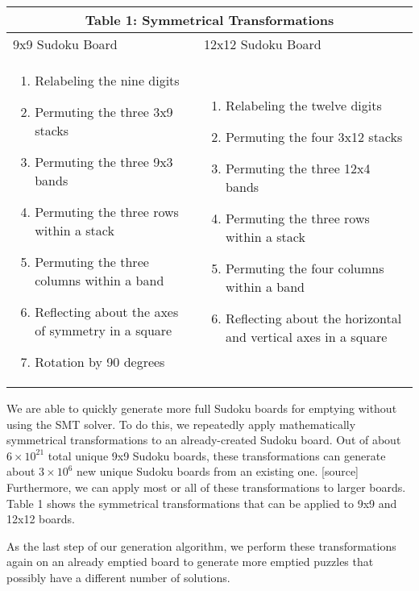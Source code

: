 \singlespace
\begin{table}
\begin{tabularx}{\textwidth}{|X|X|}
\hline
\multicolumn{2}{|c|}{Table 1: Symmetrical Transformations}\\
\hline
9x9 Sudoku Board & 12x12 Sudoku Board
\\
\hline
\begin{enumerate}
\item Relabeling the nine digits
\item Permuting the three 3x9 stacks
\item Permuting the three 9x3 bands
\item Permuting the three rows within a stack
\item Permuting the three columns within a band
\item Reflecting about the axes of symmetry in a square
\item Rotation by 90 degrees
\end{enumerate} &

\begin{enumerate}
\item Relabeling the twelve digits
\item Permuting the four 3x12 stacks
\item Permuting the three 12x4 bands
\item Permuting the three rows within a stack
\item Permuting the four columns within a band
\item Reflecting about the horizontal and vertical axes in a square
\end{enumerate}
 \\
\hline
\end{tabularx}
\end{table}

\doublespace

We are able to quickly generate more full Sudoku boards for emptying
without using the SMT solver. To do this, we repeatedly apply
mathematically symmetrical transformations to an already-created
Sudoku board. Out of about $6 \times 10^{21}$ total unique 9x9 Sudoku
boards, these transformations can generate about $3\times 10^6$ new
unique Sudoku boards from an existing one. [source] Furthermore, we
can apply most or all of these transformations to larger boards. Table
1 shows the symmetrical transformations that can be applied to 9x9 and
12x12 boards.

As the last step of our generation algorithm, we perform these transformations again on an already emptied board to generate more emptied puzzles that possibly have a different number of solutions.


